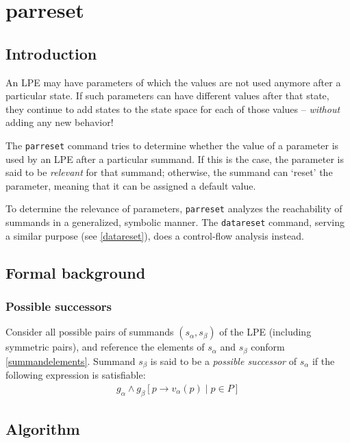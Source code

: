 \chapter{parreset}

\section{Introduction}

An LPE may have parameters of which the values are not used anymore after a particular state.
If such parameters can have different values after that state, they continue to add states to the state space for each of those values -- \emph{without} adding any new behavior!

The \texttt{parreset} command tries to determine whether the value of a parameter is used by an LPE after a particular summand.
If this is the case, the parameter is said to be \emph{relevant} for that summand; otherwise, the summand can `reset' the parameter, meaning that it can be assigned a default value.

To determine the relevance of parameters, \texttt{parreset} analyzes the reachability of summands in a generalized, symbolic manner.
The \texttt{datareset} command, serving a similar purpose (see \ref{datareset}), does a control-flow analysis instead.

\section{Formal background}

\subsection{Possible successors} \label{possiblesuccessors}

Consider all possible pairs of summands $(s_\alpha, s_\beta)$ of the LPE (including symmetric pairs), and reference the elements of $s_\alpha$ and $s_\beta$ conform \ref{summandelements}.
Summand $s_\beta$ is said to be a \emph{possible successor} of $s_\alpha$ if the following expression is satisfiable:
\begin{align*}
g_\alpha \land {g_\beta}[p \rightarrow v_\alpha(p) \;|\; p \in P]
\end{align*}

\section{Algorithm}

